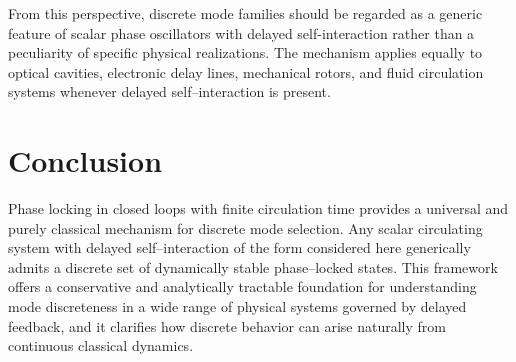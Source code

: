\documentclass[pdflatex,sn-mathphys-num]{sn-jnl}
\begin{document}
    From this perspective, discrete mode families should be regarded as a generic feature of scalar phase oscillators with delayed self-interaction rather than a peculiarity of specific physical realizations. The mechanism applies equally to optical cavities, electronic delay lines, mechanical rotors, and fluid circulation systems whenever delayed self--interaction is present.

    \section{Conclusion}
    Phase locking in closed loops with finite circulation time provides a universal and purely classical mechanism for discrete mode selection. Any scalar circulating system with delayed self--interaction of the form considered here generically admits a discrete set of dynamically stable phase--locked states. This framework offers a conservative and analytically tractable foundation for understanding mode discreteness in a wide range of physical systems governed by delayed feedback, and it clarifies how discrete behavior can arise naturally from continuous classical dynamics.
\end{document}
